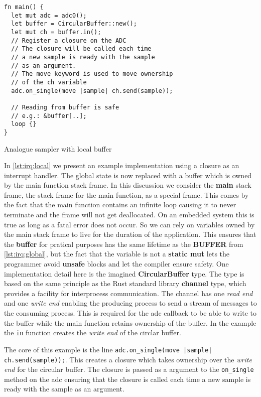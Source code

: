 \begin{listing}[H]
  \begin{verbatim}
fn main() {
  let mut adc = adc0();
  let buffer = CircularBuffer::new();
  let mut ch = buffer.in();
  // Register a closure on the ADC
  // The closure will be called each time
  // a new sample is ready with the sample
  // as an argument.
  // The move keyword is used to move ownership
  // of the ch variable
  adc.on_single(move |sample| ch.send(sample));

  // Reading from buffer is safe
  // e.g.: &buffer[..];
  loop {}
}
  \end{verbatim}
  \caption{Analogue sampler with local buffer}
  \label{lst:irq:local}
\end{listing}

In \autoref{lst:irq:local} we present an example implementation using a closure as an interrupt handler.
The global state is now replaced with a buffer which is owned by the main function stack frame.
In this discussion we consider the \textbf{main} stack frame, the stack frame for the main function, as a special frame.
This comes by the fact that the main function contains an infinite loop causing it to never terminate and the frame will not get deallocated.
On an embedded system this is true as long as a fatal error does not occur.
So we can rely on variables owned by the main stack frame to live for the duration of the application.
This ensures that the \textbf{buffer} for pratical purposes has the same lifetime as the \textbf{BUFFER} from \autoref{lst:irq:global}, but the fact that the variable is not a \textbf{static mut} lets the programmer avoid \textbf{unsafe} blocks and let the compiler ensure safety.
One implementation detail here is the imagined \textbf{CircularBuffer} type.
The type is based on the same principle as the Rust standard library \textbf{channel} type, which provides a facility for interprocess communication.
The channel has one \textit{read end} and one \textit{write end} enabling the producing process to send a stream of messages to the consuming process.
This is required for the \gls{adc} callback to be able to write to the buffer while the main function retains ownership of the buffer.
In the example the \texttt{in} function creates the \textit{write end} of the circlar buffer.

The core of this example is the line \texttt{adc.on\_single(move |sample| ch.send(sample));}.
This creates a closure which takes ownership over the \textit{write end} for the circular buffer.
The closure is passed as a argument to the \texttt{on\_single} method on the \gls{adc} ensuring that the closure is called each time a new sample is ready with the sample as an argument.

